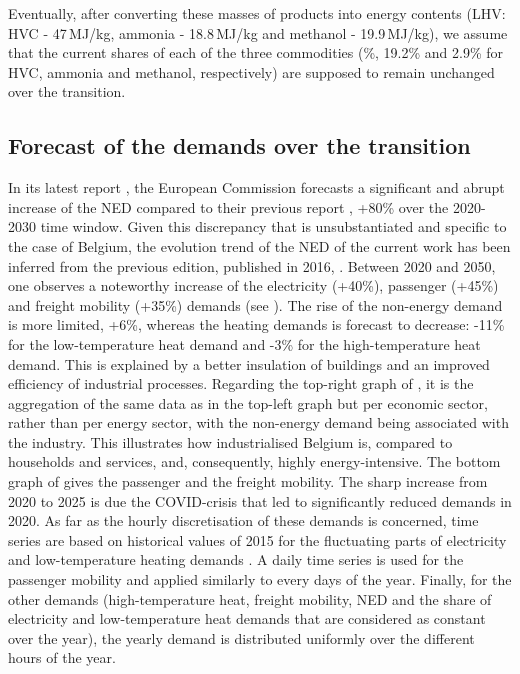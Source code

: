 Eventually, after converting these masses of products into energy contents (\ie LHV: \gls{HVC} - 47\,MJ/kg, ammonia - 18.8\,MJ/kg and methanol - 19.9\,MJ/kg), we assume that the current shares of each of the three commodities (\%, 19.2\% and 2.9\% for \gls{HVC}, ammonia and methanol, respectively) are supposed to remain unchanged over the transition.

\subsection{Forecast of the demands over the transition}
\label{subsec:cs:EUD_forecast}
In its latest report \cite{EuropeanCommission2021}, the European Commission forecasts a significant and abrupt increase of the \gls{NED} compared to their previous report \cite{EuropeanCommission2016}, \ie +80\% over the 2020-2030 time window. Given this discrepancy that is unsubstantiated and specific to the case of Belgium, the evolution trend of the \gls{NED} of the current work has been inferred from the previous edition, published in 2016, \cite{EuropeanCommission2016}. Between 2020 and 2050, one observes a noteworthy increase of the electricity (+40\%), passenger (+45\%) and freight mobility (+35\%) demands (see ). The rise of the non-energy demand is more limited, \ie +6\%, whereas the heating demands is forecast to decrease: -11\% for the low-temperature heat demand and -3\% for the high-temperature heat demand. This is explained by a better insulation of buildings and an improved efficiency of industrial processes. Regarding the top-right graph of , it is the aggregation of the same data as in the top-left graph but per economic sector, rather than per energy sector, with the non-energy demand being associated with the industry. This illustrates how industrialised Belgium is, compared to households and services, and, consequently, highly energy-intensive. The bottom graph of  gives the passenger and the freight mobility. The sharp increase from 2020 to 2025 is due the COVID-crisis that led to significantly reduced demands in 2020. As far as the hourly discretisation of these demands is concerned, time series are based on historical values of 2015 for the fluctuating parts of electricity and low-temperature heating demands \cite{Limpens2020}. A daily time series is used for the passenger mobility and applied similarly to every days of the year. Finally, for the other demands (\ie high-temperature heat, freight mobility, \gls{NED} and the share of electricity and low-temperature heat demands that are considered as constant over the year), the yearly demand is distributed uniformly over the different hours of the year.


